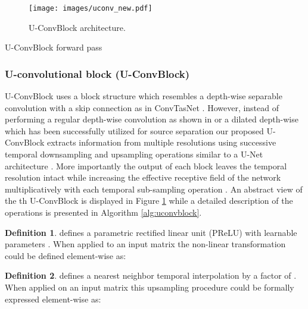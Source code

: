 \documentclass{article}
\theoremstyle{definition}
\newtheorem{definition}{Definition}[section]
\begin{document}
\begin{figure}[!htb]
    \centering
      \texttt{[image: images/uconv\_new.pdf]}
      \caption{U-ConvBlock architecture.}
      \label{fig:uconvblock}
\end{figure}
\begin{algorithm}[t!]
\SetAlgoLined
\KwInput{} 
\KwOutput{} 
 \;
 \;
 \;
 \;
 \Return \;
\caption{U-ConvBlock forward pass}
 \label{alg:uconvblock}
\end{algorithm}

\subsubsection{U-convolutional block (U-ConvBlock)}
\label{sec:net_arch:separator:main_block}
U-ConvBlock uses a block structure which resembles a depth-wise separable convolution \cite{sifre2014depthwiseseparable} with a skip connection as in ConvTasNet \cite{luo2019convTasNet}. However, instead of performing a regular depth-wise convolution as shown in \cite{chollet2017xception_depthwiseseparable} or a dilated depth-wise which has been successfully utilized for source separation \cite{luo2019convTasNet, tzinis2019improving, tzinis2019two} our proposed U-ConvBlock extracts information from multiple resolutions using  successive temporal downsampling and  upsampling operations similar to a U-Net architecture \cite{ronneberger2015original_unet}. More importantly the output of each block leaves the temporal resolution intact while increasing the effective receptive field of the network multiplicatively with each temporal sub-sampling operation \cite{luo2016effectivereceptivefield}. An abstract view of the th U-ConvBlock is displayed in Figure \ref{fig:uconvblock} while a detailed description of the operations is presented in Algorithm \ref{alg:uconvblock}. 
\begin{definition}
 defines a parametric rectified linear unit (PReLU) \cite{he2015PReLU} with  learnable parameters . When applied to an input matrix  the non-linear transformation could be defined element-wise as:

\end{definition}
\begin{definition}
 defines a nearest neighbor temporal interpolation by a factor of . When applied on an input matrix  this upsampling procedure could be formally expressed element-wise as: 
\end{definition}
\end{document}
